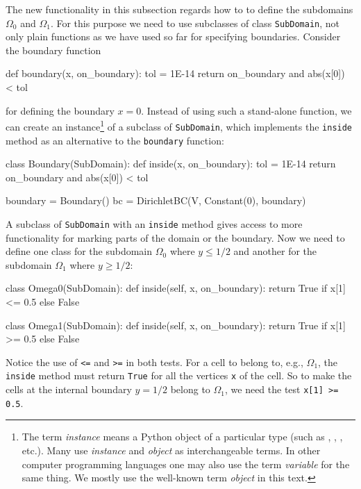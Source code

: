 The new functionality in this subsection regards how to 
to define the subdomains 
$\Omega_0$ and $\Omega_1$. For this purpose we need to
use subclasses of class {\fontsize{10pt}{10pt}\texttt{SubDomain}},
not only plain functions as we have used so far
for specifying boundaries. Consider the boundary function
\begin{python}
def boundary(x, on_boundary):
    tol = 1E-14
    return on_boundary and abs(x[0]) < tol
\end{python}
for defining the boundary $x=0$. Instead of using such a stand-alone
function, we can create an instance\footnote{The term \emph{instance}
means a Python object of a particular type (such as ,
,
, etc.).
Many use \emph{instance} and \emph{object}
as interchangeable terms. In other computer programming languages one may
also use the term \emph{variable} for the same thing.
We mostly use the well-known  term \emph{object} in this text.} 
of a subclass of {\fontsize{10pt}{10pt}\texttt{SubDomain}},
which implements the {\fontsize{10pt}{10pt}\texttt{inside}} method as an alternative to the
{\fontsize{10pt}{10pt}\texttt{boundary}} function:
\begin{python}
class Boundary(SubDomain):
    def inside(x, on_boundary):
        tol = 1E-14
        return on_boundary and abs(x[0]) < tol

boundary = Boundary()
bc = DirichletBC(V, Constant(0), boundary)
\end{python}

A subclass of {\fontsize{10pt}{10pt}\texttt{SubDomain}} with an {\fontsize{10pt}{10pt}\texttt{inside}} method gives
access to more functionality for marking parts of the domain or
the boundary. Now we need to define one class for the 
subdomain $\Omega_0$ 
where $y\leq 1/2$ and another for the subdomain $\Omega_1$ where $y\geq 1/2$:
\begin{python}
class Omega0(SubDomain):
    def inside(self, x, on_boundary):
        return True if x[1] <= 0.5 else False

class Omega1(SubDomain):
    def inside(self, x, on_boundary):
        return True if x[1] >= 0.5 else False
\end{python}
Notice the use of {\fontsize{10pt}{10pt}\texttt{<=}} and {\fontsize{10pt}{10pt}\texttt{>=}} in both tests. For a cell to
belong to, e.g., $\Omega_1$, the {\fontsize{10pt}{10pt}\texttt{inside}} method must return
{\fontsize{10pt}{10pt}\texttt{True}} for all the vertices {\fontsize{10pt}{10pt}\texttt{x}} of the cell. So to make the
cells at the internal boundary $y=1/2$ belong to $\Omega_1$, we need
the test {\fontsize{10pt}{10pt}\texttt{x[1] >= 0.5}}.


